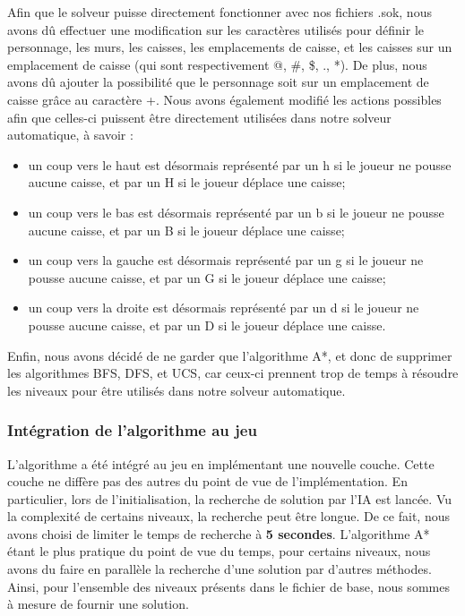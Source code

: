 \documentclass[a4paper,12pt]{article} %
\begin{document}
Afin que le solveur puisse directement fonctionner avec nos fichiers .sok, nous avons dû effectuer une modification sur les caractères utilisés pour définir le personnage, les murs, les caisses, les emplacements de caisse, et les caisses sur un emplacement de caisse (qui sont respectivement @, \#, \$, ., *). De plus, nous avons dû ajouter la possibilité que le personnage soit sur un emplacement de caisse grâce au caractère +.
Nous avons également modifié les actions possibles afin que celles-ci puissent être directement utilisées dans notre solveur automatique, à savoir : 
\begin{itemize}
	\item un coup vers le haut est désormais représenté par un h si le joueur ne pousse aucune caisse, et par un H si le joueur déplace une caisse;
	\item un coup vers le bas est désormais représenté par un b si le joueur ne pousse aucune caisse, et par un B si le joueur déplace une caisse;
	\item un coup vers la gauche est désormais représenté par un g si le joueur ne pousse aucune caisse, et par un G si le joueur déplace une caisse;
	\item un coup vers la droite est désormais représenté par un d si le joueur ne pousse aucune caisse, et par un D si le joueur déplace une caisse.
\end{itemize}

Enfin, nous avons décidé de ne garder que l'algorithme A*, et donc de supprimer les algorithmes BFS, DFS, et UCS, car ceux-ci prennent trop de temps à résoudre les niveaux pour être utilisés dans notre solveur automatique.


\subsubsection{Intégration de l'algorithme au jeu}
L'algorithme a été intégré au jeu en implémentant une nouvelle couche. Cette couche ne diffère pas des autres du point de vue de l'implémentation.
En particulier, lors de l'initialisation, la recherche de solution par l'IA est lancée. Vu la complexité de certains niveaux, la recherche peut être longue.
De ce fait, nous avons choisi de limiter le temps de recherche à \textbf{5 secondes}. L'algorithme A* étant le plus pratique du point de vue du temps, pour certains niveaux, nous avons du faire en parallèle la recherche d'une solution par d'autres méthodes. Ainsi, pour l'ensemble des niveaux présents dans le fichier de base, nous sommes
à mesure de fournir une solution.
\end{document}
